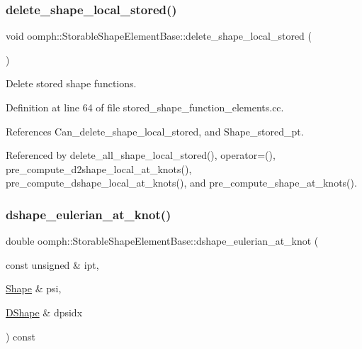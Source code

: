 \mbox{\label{classoomph_1_1StorableShapeElementBase_a4f2c2482234c2d7714e034e04ec4a271}} 
\subsubsection{\texorpdfstring{delete\+\_\+shape\+\_\+local\+\_\+stored()}{delete\_shape\_local\_stored()}}
{\footnotesize\ttfamily void oomph\+::\+Storable\+Shape\+Element\+Base\+::delete\+\_\+shape\+\_\+local\+\_\+stored (\begin{DoxyParamCaption}{ }\end{DoxyParamCaption})}



Delete stored shape functions. 



Definition at line 64 of file stored\+\_\+shape\+\_\+function\+\_\+elements.\+cc.



References Can\+\_\+delete\+\_\+shape\+\_\+local\+\_\+stored, and Shape\+\_\+stored\+\_\+pt.



Referenced by delete\+\_\+all\+\_\+shape\+\_\+local\+\_\+stored(), operator=(), pre\+\_\+compute\+\_\+d2shape\+\_\+local\+\_\+at\+\_\+knots(), pre\+\_\+compute\+\_\+dshape\+\_\+local\+\_\+at\+\_\+knots(), and pre\+\_\+compute\+\_\+shape\+\_\+at\+\_\+knots().

\mbox{\label{classoomph_1_1StorableShapeElementBase_a6dba8c995caf1ce8075c8cd7d4220aaa}} 
\subsubsection{\texorpdfstring{dshape\+\_\+eulerian\+\_\+at\+\_\+knot()}{dshape\_eulerian\_at\_knot()}}
{\footnotesize\ttfamily double oomph\+::\+Storable\+Shape\+Element\+Base\+::dshape\+\_\+eulerian\+\_\+at\+\_\+knot (\begin{DoxyParamCaption}\item[{const unsigned \&}]{ipt,  }\item[{\hyperlink{classoomph_1_1Shape}{Shape} \&}]{psi,  }\item[{\hyperlink{classoomph_1_1DShape}{D\+Shape} \&}]{dpsidx }\end{DoxyParamCaption}) const\hspace{0.3cm}{\ttfamily [virtual]}}



